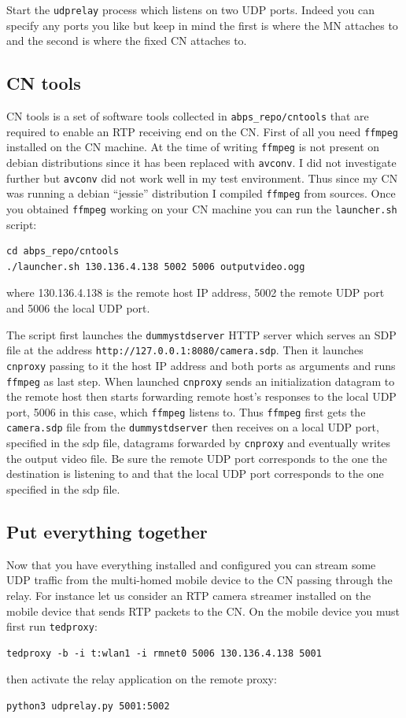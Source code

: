 \documentclass[a4paper]{article}
\begin{document}
Start the \texttt{udprelay} process which listens on two UDP ports.
Indeed you can specify any ports you like but keep in mind the first is
where the MN attaches to and the second is where the
fixed CN attaches to.

\subsection{CN tools}
CN tools is a set of software tools collected in \texttt{abps\_repo/cntools}
that are required to enable an RTP receiving end on the CN. First of all you need
\texttt{ffmpeg} installed on the CN machine. At the time of writing
\texttt{ffmpeg} is
not present on debian distributions since it has been replaced with
\texttt{avconv}. I did not investigate further but \texttt{avconv} did not work
well in my test environment. Thus since my CN was running a debian ``jessie''
distribution I compiled \texttt{ffmpeg} from sources. Once you obtained
\texttt{ffmpeg} working on your CN machine you can run the \texttt{launcher.sh} script:

\begin{lstlisting}
cd abps_repo/cntools
./launcher.sh 130.136.4.138 5002 5006 outputvideo.ogg
\end{lstlisting}

where 130.136.4.138 is the remote host IP address, 5002 the remote UDP port and
5006 the local UDP port.

The script first launches the \texttt{dummystdserver} HTTP server which
serves an SDP file at the address \texttt{http://127.0.0.1:8080/camera.sdp}.
Then it launches \texttt{cnproxy} passing to it the host IP address and both
ports as arguments and runs \texttt{ffmpeg} as last step. When launched \texttt{cnproxy} 
sends an initialization datagram to the remote host then starts forwarding
remote host's responses to the local UDP port, 5006 in this case, which \texttt{ffmpeg}
listens to. Thus \texttt{ffmpeg} first gets the \texttt{camera.sdp} file from
the \texttt{dummystdserver} then receives on a local UDP port, specified in the sdp file,
datagrams forwarded by \texttt{cnproxy} and eventually writes the output video file.
Be sure the remote UDP port corresponds to the one the destination is listening
to and that the local UDP port corresponds to the one specified in the sdp
file.

\subsection{Put everything together}
Now that you have everything installed and configured you can stream some UDP
traffic from the multi-homed mobile device to the CN passing through the relay. For instance
let us consider an RTP camera streamer installed on the mobile device that
sends RTP packets to the CN. On the mobile device you must first run
\texttt{tedproxy}:
\begin{lstlisting}
tedproxy -b -i t:wlan1 -i rmnet0 5006 130.136.4.138 5001
\end{lstlisting}
then activate the relay application on the remote proxy:
\begin{lstlisting}
python3 udprelay.py 5001:5002
\end{lstlisting}
\end{document}
